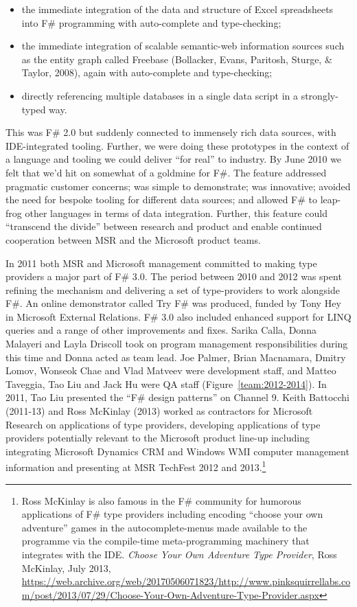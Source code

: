 \documentclass[acmsmall]{acmart}\settopmatter{}
\begin{document}
\begin{itemize}
\item the immediate integration of the data and structure of Excel spreadsheets into F\# programming with auto-complete and type-checking;
\item the immediate integration of scalable semantic-web information sources such as the entity graph called Freebase (Bollacker, Evans, Paritosh, Sturge, \& Taylor, 2008), again with auto-complete and type-checking;
\item directly referencing multiple databases in a single data script in a strongly-typed way.
\end{itemize}


This was F\# 2.0 but suddenly connected to immensely rich data sources, with IDE-integrated tooling.  Further, we were
doing these prototypes in the context of a language and tooling we could deliver “for real” to industry.  By June 2010 we
felt that we’d hit on somewhat of a goldmine for F\#. The feature addressed pragmatic customer concerns; was simple to
demonstrate; was innovative; avoided the need for bespoke tooling for different data sources; and allowed F\# to leap-frog
other languages in terms of data integration. Further, this feature could “transcend the divide” between research and product
and enable continued cooperation between MSR and the Microsoft product teams. 

In 2011 both MSR and Microsoft management committed to making type providers a major part of F\# 3.0. The period
between 2010 and 2012 was spent refining the mechanism and delivering a set of type-providers to work alongside F\#.
An online demonstrator called Try F\# was produced, funded by Tony Hey in Microsoft External Relations. F\# 3.0 also
included enhanced support for LINQ queries and a range of other improvements and fixes. Sarika Calla, Donna Malayeri
and Layla Driscoll took on program management responsibilities during this time and Donna acted as team lead.  Joe Palmer, Brian Macnamara, Dmitry
Lomov, Wonseok Chae and Vlad Matveev were development staff, and Matteo Taveggia, Tao Liu and
Jack Hu were QA staff (Figure~\ref{team:2012-2014}). In 2011, Tao Liu presented the “F\# design patterns” on Channel 9.
Keith Battocchi (2011-13) and Ross McKinlay (2013) worked as contractors for Microsoft Research on applications of type
providers, developing applications of type providers potentially relevant to the Microsoft product line-up including integrating
Microsoft Dynamics CRM and Windows WMI computer management information and presenting at MSR TechFest 2012 and
2013.\footnote{ Ross McKinlay is also famous in the F\# community for humorous applications of F\# type providers
including encoding “choose your own adventure” games in the autocomplete-menus made available to the programme
via the compile-time meta-programming machinery that integrates with the IDE. \textit{Choose Your Own Adventure
Type Provider}, Ross McKinlay, July 2013, \url{https://web.archive.org/web/20170506071823/http://www.pinksquirrellabs.com/post/2013/07/29/Choose-Your-Own-Adventure-Type-Provider.aspx}}
\end{document}
